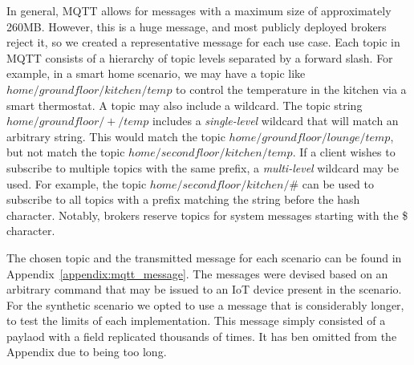 In general, MQTT allows for messages with a maximum size of approximately 260MB.
However, this is a huge message, and most publicly deployed brokers reject it, so we created a representative message for each use case.
Each topic in MQTT consists of a hierarchy of topic levels separated by a forward slash.
For example, in a smart home scenario, we may have a topic like $home/groundfloor/kitchen/temp$ to control the temperature in the kitchen via a smart thermostat.
A topic may also include a wildcard.
The topic string $home/groundfloor/+/temp$ includes a \textit{single-level} wildcard that will match an arbitrary string.
This would match the topic $home/groundfloor/lounge/temp$, but not match the topic $home/secondfloor/kitchen/temp$.
If a client wishes to subscribe to multiple topics with the same prefix, a \textit{multi-level} wildcard may be used.
For example, the topic $home/secondfloor/kitchen/\#$ can be used to subscribe to all topics with a prefix matching the string before the hash character.
Notably, brokers reserve topics for system messages starting with the \$ character.

The chosen topic and the transmitted message for each scenario can be found in Appendix~\ref{appendix:mqtt_message}.
The messages were devised based on an arbitrary command that may be issued to an IoT device present in the scenario.
For the synthetic scenario we opted to use a message that is considerably longer, to test the limits of each implementation.
This message simply consisted of a paylaod with a field replicated thousands of times.
It has ben omitted from the Appendix due to being too long.